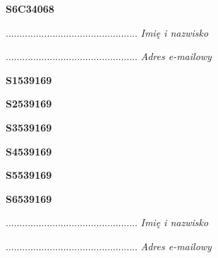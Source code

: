 \begin{turn}{90}\huge \textbf{S6C34068}\end{turn}

\begin{turn}{90}\begin{minipage}{\linewidth} \vspace{20mm} ................................................  \textit{Imię i nazwisko}\end{minipage}\end{turn}

\begin{turn}{90}\begin{minipage}{\linewidth} \vspace{20mm} ................................................  \textit{Adres e-mailowy}\end{minipage}\end{turn}

\begin{turn}{90}\huge \textbf{S1539169}\end{turn}

\begin{turn}{90}\huge \textbf{S2539169}\end{turn}

\begin{turn}{90}\huge \textbf{S3539169}\end{turn}

\begin{turn}{90}\huge \textbf{S4539169}\end{turn}

\begin{turn}{90}\huge \textbf{S5539169}\end{turn}

\begin{turn}{90}\huge \textbf{S6539169}\end{turn}

\begin{turn}{90}\begin{minipage}{\linewidth} \vspace{20mm} ................................................  \textit{Imię i nazwisko}\end{minipage}\end{turn}

\begin{turn}{90}\begin{minipage}{\linewidth} \vspace{20mm} ................................................  \textit{Adres e-mailowy}\end{minipage}\end{turn}

